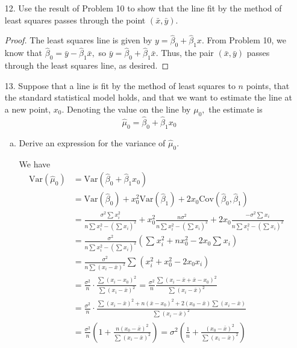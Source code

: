\documentclass{article}
\newcommand{\var}{\mathrm{Var}}
\newcommand{\cov}{\mathrm{Cov}}
\begin{document}
\begin{itemize}
	\item[12.] Use the result of Problem 10 to show that the line fit by the method of least squares passes through the point $(\bar x, \bar y).$
		\begin{proof}
			The least squares line is given by $y=\hat\beta_0+\hat\beta_1x.$ From Problem 10, we know that $\hat\beta_0=\bar y-\hat\beta_1\bar x,$ so $\bar y=\hat\beta_0+\hat\beta_1\bar x.$ Thus, the pair $(\bar x, \bar y)$ passes through the least squares line, as desired.
		\end{proof}

	\item[13.] Suppose that a line is fit by the method of least squares to $n$ points, that the standard statistical model holds, and that we want to estimate the line at a new point, $x_0.$ Denoting the value on the line by $\mu_0,$ the estimate is \[\hat\mu_0=\hat\beta_0+\hat\beta_1x_0\] 
		\begin{enumerate}[a.]
			\item Derive an expression for the variance of $\hat\mu_0.$
				\begin{soln}
					We have
					\begin{align*}
						\var(\hat\mu_0) &= \var(\hat\beta_0 + \hat\beta_1x_0) \\
						&= \var(\hat\beta_0) + x_0^2\var(\hat\beta_1)+2x_0\cov(\hat\beta_0, \hat\beta_1) \\
						&= \frac{\sigma^2\sum_{}^{}x_i^2}{n\sum_{}^{}x_i^2-\left( \sum_{}^{}x_i \right)^2} + x_0^2\frac{n\sigma^2}{n\sum_{}^{}x_i^2 - \left( \sum_{}^{}x_i \right)^2} + 2x_0\frac{-\sigma^2\sum_{}^{}x_i}{n\sum_{}^{}x_i^2-\left( \sum_{}^{}x_i \right)^2} \\
						&= \frac{\sigma^2}{n\sum_{}^{}x_i^2 - \left( \sum_{}^{}x_i \right)^2}\left(  \sum_{}^{}x_i^2 + nx_0^2 - 2x_0\sum_{}^{}x_i \right) \\
						&= \frac{\sigma^2}{n\sum_{}^{}(x_i-\bar x)^2}\sum_{}^{}\left(x_i^2+x_0^2-2x_0x_i \right) \\
						&= \frac{\sigma^2}{n} \cdot \frac{\sum_{}^{}(x_i-x_0)^2}{\sum_{}^{}(x_i-\bar x)^2} = \frac{\sigma^2}{n} \frac{\sum_{}^{}(x_i-\bar x+\bar x-x_0)^2}{\sum_{}^{}(x_i-\bar x)^2} \\
						&= \frac{\sigma^2}{n} \cdot \frac{\sum_{}^{}(x_i-\bar x)^2 + n(\bar x-x_0)^2 + 2(x_0-\bar x)\sum_{}^{}(x_i-\bar x)}{\sum_{}^{}(x_i-\bar x)^2} \\
						&= \frac{\sigma^2}{n} \left( 1+\frac{n(x_0-\bar x)^2}{\sum_{}^{}(x_i-\bar x)^2} \right) = \sigma^2\left( \frac{1}{n} + \frac{(x_0-\bar x)^2}{\sum_{}^{}(x_i-\bar x)^2} \right)
					\end{align*}
				\end{soln}


\end{enumerate}
\end{itemize}
\end{document}
